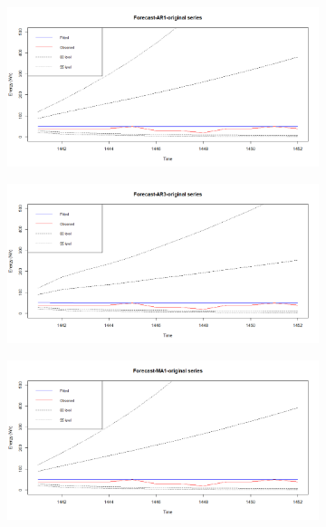 \documentclass[12pt]{article}
\begin{document}
\begin{figure}[H]
  \centering
  \begin{subfigure}[b]{0.49\linewidth}
    \includegraphics[width=\linewidth]{figure14-1.png}
  \end{subfigure}
  \begin{subfigure}[b]{0.49\linewidth}
    \includegraphics[width=\linewidth]{figure14-2.png}
  \end{subfigure}
  \begin{subfigure}[b]{0.49\linewidth}
    \includegraphics[width=\linewidth]{figure14-3.png}
  \end{subfigure}

\end{figure}
\end{document}
